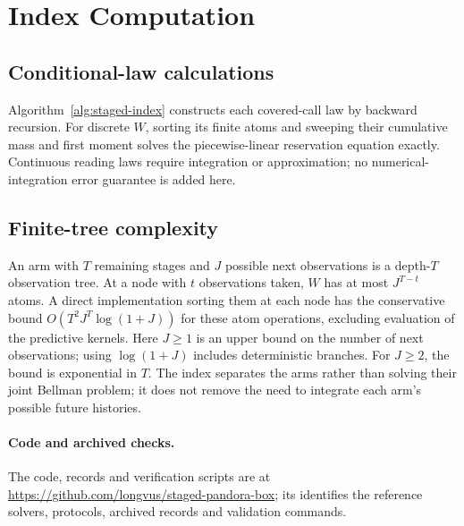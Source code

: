 \section{Index Computation}
\label{app:computation}

\subsection{Conditional-law calculations}
Algorithm~\ref{alg:staged-index} constructs each covered-call law by backward
recursion. For discrete $W$, sorting its finite atoms and sweeping their
cumulative mass and first moment solves the piecewise-linear reservation
equation exactly. Continuous reading laws require integration or
approximation; no numerical-integration error guarantee is added here.

\subsection{Finite-tree complexity}
An arm with $T$ remaining stages and $J$ possible next observations is a depth-$T$ observation
tree. At a node with $t$ observations taken, $W$ has at most $J^{T-t}$ atoms. A direct
implementation sorting them at each node has the
conservative bound $O(T^2 J^T\log(1+J))$ for these atom operations, excluding evaluation of the
predictive kernels. Here $J\ge1$ is an upper bound on the number of
next observations; using $\log(1+J)$ includes deterministic branches. For $J\ge2$,
the bound is exponential in $T$. The index separates
the arms rather than solving their joint Bellman problem; it does not remove the need to
integrate each arm's possible future histories.

\paragraph{Code and archived checks.}
The code, records and verification scripts are at
\url{https://github.com/longvus/staged-pandora-box}; its
 identifies the reference solvers,
protocols, archived records and validation commands.
